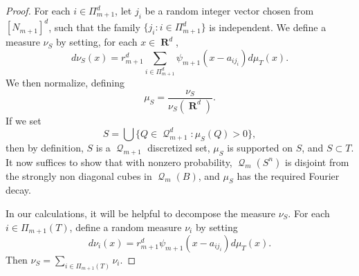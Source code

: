 \documentclass[12pt,reqno]{amsart}
\DeclareMathOperator{\RR}{\mathbf{R}}
\DeclareMathOperator{\DQ}{\mathcal{Q}}
\begin{document}
\begin{proof}
	For each $i \in \Pi_{m+1}^d$, let $j_i$ be a random integer vector chosen from $[N_{m+1}]^d$, such that the family $\{ j_i : i \in \Pi_{m+1}^d \}$ is independent. We define a measure $\nu_S$ by setting, for each $x \in \RR^d$,
	\[ d\nu_S(x) = r_{m+1}^d \sum_{i \in \Pi_{m+1}^d} \psi_{m+1}(x - a_{ij_i}) d\mu_T(x). \]
	We then normalize, defining
	\[ \mu_S = \frac{\nu_S}{\nu_S(\RR^d)}. \]
	If we set
	\[ S = \bigcup \{ Q \in \DQ_{m+1}^d : \mu_S(Q) > 0 \}, \]
	then by definition, $S$ is a $\DQ_{m+1}$ discretized set, $\mu_S$ is supported on $S$, and $S \subset T$. It now suffices to show that with nonzero probability, $\DQ_m(S^n)$ is disjoint from the strongly non diagonal cubes in $\DQ_m(B)$, and $\mu_S$ has the required Fourier decay.

    In our calculations, it will be helpful to decompose the measure $\nu_S$. For each $i \in \Pi_{m+1}(T)$, define a random measure $\nu_i$ by setting
	\[ d\nu_i(x) = r_{m+1}^d \psi_{m+1}(x - a_{ij_i}) d\mu_T(x). \]
	Then $\nu_S = \sum_{i \in \Pi_{m+1}(T)} \nu_i$.


\end{proof}
\end{document}
